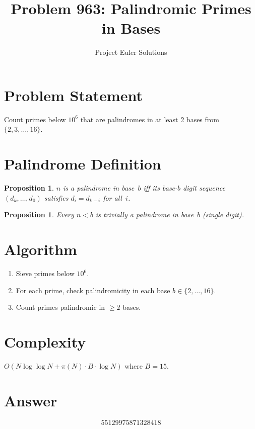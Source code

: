 \documentclass[11pt]{article}
\title{Problem 963: Palindromic Primes in Bases}
\author{Project Euler Solutions}
\date{}
\newtheorem{proposition}[theorem]{Proposition}
\begin{document}
\maketitle

\section{Problem Statement}
Count primes below $10^6$ that are palindromes in at least 2 bases from $\{2, 3, \ldots, 16\}$.

\section{Palindrome Definition}
\begin{proposition}
$n$ is a palindrome in base~$b$ iff its base-$b$ digit sequence $(d_k, \ldots, d_0)$ satisfies $d_i = d_{k-i}$ for all~$i$.
\end{proposition}

\begin{proposition}
Every $n < b$ is trivially a palindrome in base~$b$ (single digit).
\end{proposition}

\section{Algorithm}
\begin{enumerate}
\item Sieve primes below $10^6$.
\item For each prime, check palindromicity in each base $b \in \{2, \ldots, 16\}$.
\item Count primes palindromic in $\ge 2$ bases.
\end{enumerate}

\section{Complexity}
$O(N \log\log N + \pi(N) \cdot B \cdot \log N)$ where $B = 15$.

\section{Answer}

\[
\boxed{55129975871328418}
\]
\end{document}
